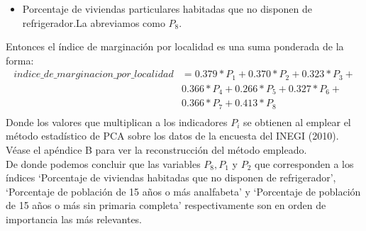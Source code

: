 \documentclass[paper=letter, fontsize=11pt]{scrartcl}
\numberwithin{equation}{section} %
\numberwithin{figure}{section} %
\numberwithin{table}{section} %
\begin{document}
\begin{enumerate}
\begin{enumerate}
\begin{itemize}
\item Porcentaje de viviendas particulares habitadas que no disponen de refrigerador.La abreviamos como $P_8$.
\end{itemize}
Entonces el índice de marginación por localidad es una suma ponderada de la forma:    
\[\begin{split} 
indice\_de\_marginacion\_por\_localidad& =0.379*P_1 + 0.370*P_2+0.323*P_3 + \\
& 0.366*P_4+ 0.266*P_5 + 0.327*P_6+\\
&0.366*P_7+ 0.413*P_8 \\
\end{split}
\]
Donde los valores que multiplican a los indicadores $P_i$ se obtienen al emplear el método estadístico de PCA sobre los datos de la encuesta del INEGI (2010). Véase el apéndice B para ver la reconstrucción del método empleado.\\
De donde podemos concluir que las variables $P_8,P_1 $ y $  P_2$ que corresponden a los índices ‘Porcentaje de viviendas habitadas que no disponen de refrigerador’, ‘Porcentaje de población de 15 años o más analfabeta’ y ‘Porcentaje de población de 15 años o más sin primaria completa’ respectivamente son en orden de importancia las más relevantes.


\end{enumerate}
\end{enumerate}
\end{document}
